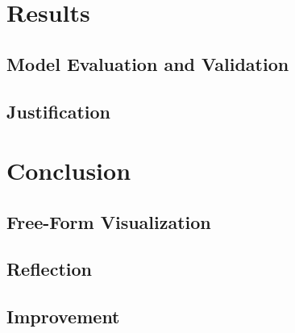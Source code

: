 \documentclass[12pt]{article}
\begin{document}
\section{Results}
\subsection{Model Evaluation and Validation}

\subsection{Justification}

\section{Conclusion}
\subsection{Free-Form Visualization}

\subsection{Reflection}

\subsection{Improvement}
\end{document}

